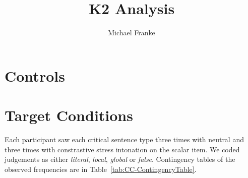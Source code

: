 \documentclass[fleqn,reqno,10pt]{article}
\title{K2 Analysis}
\author{Michael Franke}
\date{}
\begin{document}
\maketitle

\section{Controls}
\label{sec:controls}



\section{Target Conditions}
\label{sec:target-conditions}

Each participant saw each critical sentence type three times with
neutral and three times with constrastive stress intonation on the
scalar item. We coded judgements as either \emph{literal},
\emph{local}, \emph{global} or \emph{false}. Contingency tables of the
observed frequencies are in Table~\ref{tab:CC-ContingencyTable}.
%
\end{document}

